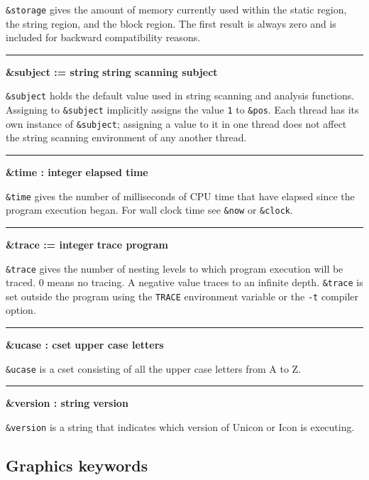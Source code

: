 \noindent
{}\texttt{\&storage} gives the amount of memory
currently used within the static region, the string region, and the
block region. The first result is always zero and is included for
backward compatibility reasons.

\bigskip\hrule\vspace{0.1cm}
\noindent
{\bf \&subject := string } \hfill {\bf string scanning subject}

\noindent
{}\texttt{\&subject} holds the default
value used in string scanning and analysis functions. Assigning to
\texttt{\&subject} implicitly assigns the value \texttt{1} to
\texttt{\&pos}.
Each thread has its own instance of 
\texttt{\&subject}; \ConcurrencyIssue assigning a value to it in one
thread does not affect the string scanning environment of any another thread.

\bigskip\hrule\vspace{0.1cm}
\noindent
{\bf \&time : integer } \hfill {\bf elapsed time}

\noindent
{}\texttt{\&}\texttt{time}
gives the number of milliseconds of CPU time that have elapsed since
the program execution began. For wall clock time see \texttt{\&now} or
\texttt{\&clock}.

\bigskip\hrule\vspace{0.1cm}
\noindent
{\bf \&trace := integer } \hfill {\bf trace program}

\noindent
\texttt{\&trace} gives the number of nesting levels to which
program execution will be traced. 0 means no tracing.
A negative value traces to an infinite depth.
\texttt{\&trace} is set outside the program using the \texttt{TRACE}
environment variable or the
\texttt{{}-t} compiler option.

\bigskip\hrule\vspace{0.1cm}
\noindent
{\bf \&ucase : cset } \hfill {\bf upper case letters}

\noindent
{}\texttt{\&ucase} is a cset consisting of all the upper
case letters from A to Z.

\bigskip\hrule\vspace{0.1cm}
\noindent
{\bf \&version : string } \hfill {\bf version}

\noindent
{}\texttt{\&version} is a string that indicates which
version of Unicon or Icon is executing.

\subsection*{Graphics keywords}

